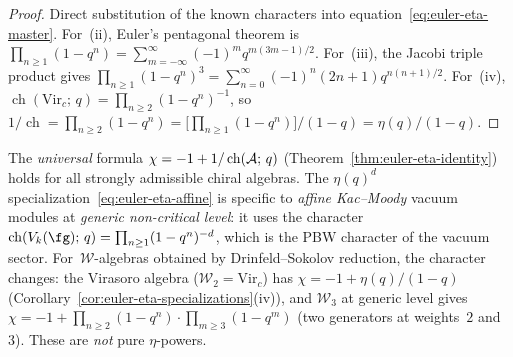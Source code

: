 \begin{proof}
Direct substitution of the known characters into
equation~\eqref{eq:euler-eta-master}. For~(ii), Euler's
pentagonal theorem is
$\prod_{n\ge 1}(1-q^n)
=\sum_{m=-\infty}^{\infty}(-1)^m q^{m(3m-1)/2}$.
For~(iii), the Jacobi triple product gives
$\prod_{n\ge 1}(1-q^n)^3
=\sum_{n=0}^{\infty}(-1)^n(2n+1)q^{n(n+1)/2}$.
For~(iv), $\operatorname{ch}(\mathrm{Vir}_c;\,q)
=\prod_{n\ge 2}(1-q^n)^{-1}$, so
$1/\operatorname{ch}=\prod_{n\ge 2}(1-q^n)
=\bigl[\prod_{n\ge 1}(1-q^n)\bigr]/(1-q)
=\eta(q)/(1-q)$.
\end{proof}

\begin{remark}
\label{rem:euler-eta-scope}
The \emph{universal} formula
$\chi=-1+1/\operatorname{ch}(\mathcal{A};\,q)$
(Theorem~\ref{thm:euler-eta-identity}) holds for all
strongly admissible chiral algebras. The
$\eta(q)^d$ specialization~\eqref{eq:euler-eta-affine}
is specific to \emph{affine Kac--Moody} vacuum modules
at \emph{generic non-critical level}: it uses the
character $\operatorname{ch}(V_k(\fg);\,q)
=\prod_{n\ge 1}(1-q^n)^{-d}$, which is the PBW
character of the vacuum sector. For~$\mathcal W$-algebras
obtained by Drinfeld--Sokolov reduction, the character
changes: the Virasoro algebra
($\mathcal W_2 = \mathrm{Vir}_c$) has
$\chi = -1+\eta(q)/(1{-}q)$
(Corollary~\ref{cor:euler-eta-specializations}(iv)),
and $\mathcal W_3$ at generic level gives
$\chi = -1+\prod_{n\ge 2}(1-q^n)\cdot
\prod_{m\ge 3}(1-q^m)$
(two generators at weights~$2$ and~$3$).
These are \emph{not} pure $\eta$-powers.
\end{remark}

